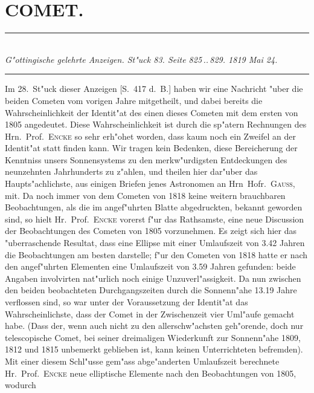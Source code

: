 \documentclass[12pt,a4paper]{article}
\begin{document}
\newpage

\section*{COMET.}

\begin{center}
\rule{0.6\textwidth}{0.4pt}\\[0.5em]
\textit{G"ottingische gelehrte Anzeigen. St"uck 83. Seite 825\,..\,829. 1819 Mai 24.}\\[0.3em]
\rule{0.6\textwidth}{0.4pt}
\end{center}

Im 28.~St"uck dieser Anzeigen [S.~417 d.~B.] haben wir eine Nachricht "uber die beiden Cometen
vom vorigen Jahre mitgetheilt, und dabei bereits die Wahrscheinlichkeit der Identit"at des einen dieses
Cometen mit dem ersten von 1805 angedeutet. Diese Wahrscheinlichkeit ist durch die sp"atern Rechnungen
des Hrn.~Prof.~\textsc{Encke} so sehr erh"ohet worden, dass kaum noch ein Zweifel an der Identit"at statt finden
kann. Wir tragen kein Bedenken, diese Bereicherung der Kenntniss unsers Sonnensystems zu den
merkw"urdigsten Entdeckungen des neunzehnten Jahrhunderts zu z"ahlen, und theilen hier dar"uber das
Haupts"achlichste, aus einigen Briefen jenes Astronomen an Hrn~Hofr.~\textsc{Gauss}, mit. Da noch immer
von dem Cometen von 1818 keine weitern brauchbaren Beobachtungen, als die im angef"uhrten Blatte
abgedruckten, bekannt geworden sind, so hielt Hr.~Prof.~\textsc{Encke} vorerst f"ur das Rathsamste, eine neue
Discussion der Beobachtungen des Cometen von 1805 vorzunehmen. Es zeigt sich hier das "uberraschende
Resultat, dass eine Ellipse mit einer Umlaufszeit von 3.42 Jahren die Beobachtungen am besten darstelle;
f"ur den Cometen von 1818 hatte er nach den angef"uhrten Elementen eine Umlaufszeit von 3.59 Jahren
gefunden: beide Angaben involvirten nat"urlich noch einige Unzuverl"assigkeit. Da nun zwischen den
beiden beobachteten Durchgangszeiten durch die Sonnenn"ahe 13.19 Jahre verflossen sind, so war unter der
Voraussetzung der Identit"at das Wahrscheinlichste, dass der Comet in der Zwischenzeit vier Uml"aufe
gemacht habe. (Dass der, wenn auch nicht zu den allerschw"achsten geh"orende, doch nur telescopische
Comet, bei seiner dreimaligen Wiederkunft zur Sonnenn"ahe 1809, 1812 und 1815 unbemerkt geblieben
ist, kann keinen Unterrichteten befremden). Mit einer diesem Schl"usse gem"ass abge"anderten Umlaufszeit
berechnete Hr.~Prof.~\textsc{Encke} neue elliptische Elemente nach den Beobachtungen von 1805, wodurch
\end{document}
